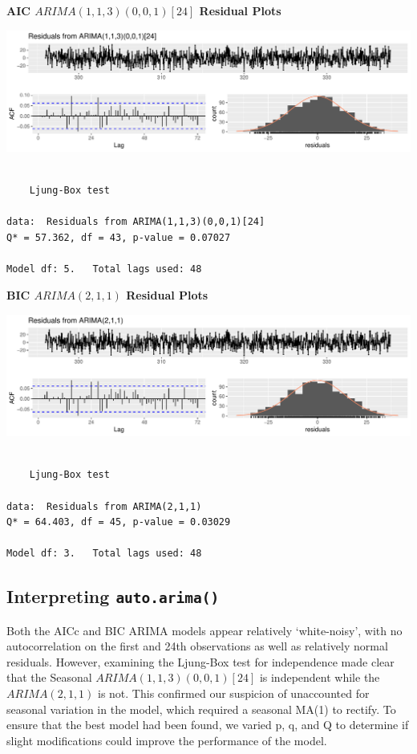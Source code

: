 \documentclass[openany]{book}
\begin{document}
\textbf{AIC \(ARIMA(1,1,3)(0,0,1)[24]\) Residual Plots}

\includegraphics{Group2_Project1_Fall2019_files/figure-latex/unnamed-chunk-19-1.pdf}

\begin{verbatim}

    Ljung-Box test

data:  Residuals from ARIMA(1,1,3)(0,0,1)[24]
Q* = 57.362, df = 43, p-value = 0.07027

Model df: 5.   Total lags used: 48
\end{verbatim}

\textbf{BIC \(ARIMA(2,1,1)\) Residual Plots}

\includegraphics{Group2_Project1_Fall2019_files/figure-latex/unnamed-chunk-20-1.pdf}

\begin{verbatim}

    Ljung-Box test

data:  Residuals from ARIMA(2,1,1)
Q* = 64.403, df = 45, p-value = 0.03029

Model df: 3.   Total lags used: 48
\end{verbatim}

\hypertarget{interpreting-auto.arima}{%
\subsection{\texorpdfstring{Interpreting
\texttt{auto.arima()}}{Interpreting auto.arima()}}\label{interpreting-auto.arima}}

Both the AICc and BIC ARIMA models appear relatively `white-noisy', with
no autocorrelation on the first and 24th observations as well as
relatively normal residuals. However, examining the Ljung-Box test for
independence made clear that the Seasonal \(ARIMA (1,1,3)(0,0,1)[24]\)
is independent while the \(ARIMA(2,1,1)\) is not. This confirmed our
suspicion of unaccounted for seasonal variation in the model, which
required a seasonal MA(1) to rectify. To ensure that the best model had
been found, we varied p, q, and Q to determine if slight modifications
could improve the performance of the model.
\end{document}
